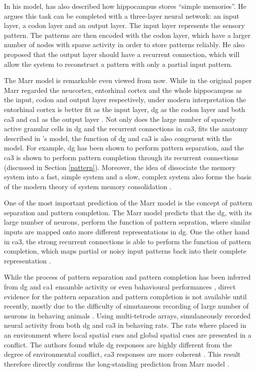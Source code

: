 In his model, \citet{marr71} has also described how hippocampus stores ``simple memories''. He argues this task can be completed with a three-layer neural network: an input layer, a codon layer and an output layer. The input layer represents the sensory pattern. The patterns are then encoded with the codon layer, which have a larger number of nodes with sparse activity in order to store patterns reliably. He also proposed that the output layer should have a recurrent connection, which will allow the system to reconstruct a pattern with only a partial input pattern. 

The Marr model is remarkable even viewed from now. While in the original paper Marr \citep{marr71} regarded the neucortex, entorhinal cortex and the whole hippocampus as the input, codon and output layer respectively, under modern interpretation the entorhinal cortex is better fit as the input layer, \gls{dg} as the codon layer and both \gls{ca3} and \gls{ca1} as the output layer \citep{willshaw15}. Not only does the large number of sparsely active granular cells in \gls{dg} and the recurrent connections in \gls{ca3}, fits the anatomy described in \citet{marr71}'s model, the function of \gls{dg} and \gls{ca3} is also congruent with the model. For example, \gls{dg} has been shown to perform pattern separation, and the \gls{ca3} is shown to perform pattern completion through its recurrent connections (discussed in Section \ref{pattern}).  Moreover, the idea of dissociate the memory system into a fast, simple system and a slow, complex system also forms the basis of the modern theory of system memory consolidation \citep{squire92, mcclelland13}. 

One of the most important prediction of the Marr model \citep{marr71} is the concept of pattern separation and pattern completion. The Marr model predicts that the \gls{dg}, with its large number of neurons, perform the function of pattern sepration, where similar inputs are mapped onto more different representations in \gls{dg}. One the other hand in \gls{ca3}, the strong recurrent connections is able to perform the function of pattern completion, which maps partial or noisy input patterns back into their complete representation \citep{rolls13, knierim16}. 

While the process of pattern separation and pattern completion has been inferred from \gls{dg} and \gls{ca1} ensamble activity or even bahavioural performances \citep{santoro13, rolls13}, direct evidence for the pattern separation and pattern completion is not available until recently, mostly due to the difficulty of simutaneous recording of large number of neurons in behaving animals \citep{knierim16}. Using multi-tetrode arrays, \citet{neunuebel14} simulaneously recorded neural activity from both \gls{dg} and \gls{ca3} in behaving rats. The rats where placed in an environment where local spatial cues and global spatial cues are presented in a conflict. The authors found while \gls{dg} responses are highly different from the degree of environmental conflict, \gls{ca3} responses are more coherent \citep{neunuebel14}. This result therefore directly confirms the long-standing prediction from Marr model \cite{rolls13, knierim16}. 

